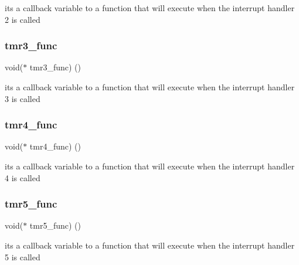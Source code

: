 it\textquotesingle{}s a callback variable to a function that will execute when the interrupt handler 2 is called \mbox{\label{_timer__libs_8c_a68d6c55fc25c77cde3f602c4a34c4869}} 
\subsubsection{tmr3\+\_\+func}
{\footnotesize\ttfamily void($\ast$ tmr3\+\_\+func) ()}

it\textquotesingle{}s a callback variable to a function that will execute when the interrupt handler 3 is called \mbox{\label{_timer__libs_8c_a42b8c19ef88770d60bcb3cf34d2f0acd}} 
\subsubsection{tmr4\+\_\+func}
{\footnotesize\ttfamily void($\ast$ tmr4\+\_\+func) ()}

it\textquotesingle{}s a callback variable to a function that will execute when the interrupt handler 4 is called \mbox{\label{_timer__libs_8c_a8620a4d79b6af2e082b58843b1a7c677}} 
\subsubsection{tmr5\+\_\+func}
{\footnotesize\ttfamily void($\ast$ tmr5\+\_\+func) ()}

it\textquotesingle{}s a callback variable to a function that will execute when the interrupt handler 5 is called 
